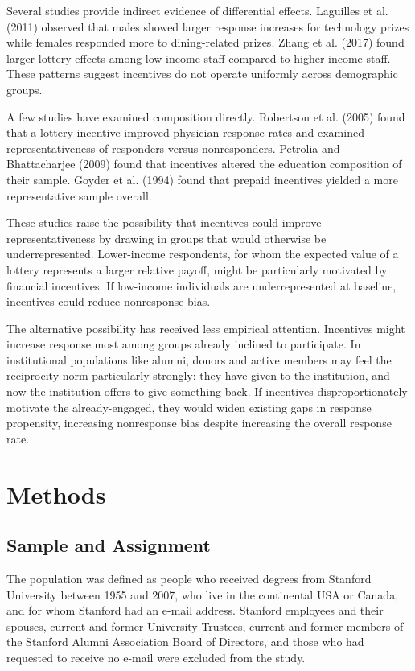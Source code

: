 \documentclass[12pt]{article}
\begin{document}
Several studies provide indirect evidence of differential effects. Laguilles et al. (2011) observed that males showed larger response increases for technology prizes while females responded more to dining-related prizes. Zhang et al. (2017) found larger lottery effects among low-income staff compared to higher-income staff. These patterns suggest incentives do not operate uniformly across demographic groups.

A few studies have examined composition directly. Robertson et al. (2005) found that a lottery incentive improved physician response rates and examined representativeness of responders versus nonresponders. Petrolia and Bhattacharjee (2009) found that incentives altered the education composition of their sample. Goyder et al. (1994) found that prepaid incentives yielded a more representative sample overall.

These studies raise the possibility that incentives could improve representativeness by drawing in groups that would otherwise be underrepresented. Lower-income respondents, for whom the expected value of a lottery represents a larger relative payoff, might be particularly motivated by financial incentives. If low-income individuals are underrepresented at baseline, incentives could reduce nonresponse bias.

The alternative possibility has received less empirical attention. Incentives might increase response most among groups already inclined to participate. In institutional populations like alumni, donors and active members may feel the reciprocity norm particularly strongly: they have given to the institution, and now the institution offers to give something back. If incentives disproportionately motivate the already-engaged, they would widen existing gaps in response propensity, increasing nonresponse bias despite increasing the overall response rate.


\section{Methods}

\subsection{Sample and Assignment}

The population was defined as people who received degrees from Stanford University between 1955 and 2007, who live in the continental USA or Canada, and for whom Stanford had an e-mail address. Stanford employees and their spouses, current and former University Trustees, current and former members of the Stanford Alumni Association Board of Directors, and those who had requested to receive no e-mail were excluded from the study.
\end{document}

